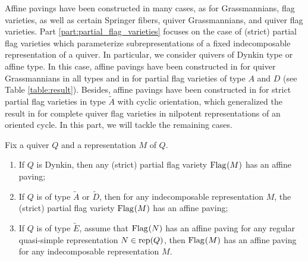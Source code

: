 Affine pavings have been constructed in many cases, as for Grassmannians, flag varieties, as well as certain Springer fibers, quiver Grassmannians, and quiver flag varieties. Part \ref{part:partial_flag_varieties} focuses on the case of (strict) partial flag varieties which parameterize subrepresentations of a fixed indecomposable representation of a quiver. In particular, we consider quivers of Dynkin type or affine type.
In this case, affine pavings have been constructed in \cite{irelli2019cell} for quiver Grassmannians in all types and in \cite{maksimau2019flag} for partial flag varieties of type $A$ and $D$ (see Table \ref{table:result}). Besides, affine pavings 
have been constructed in \cite[Theorem 6.3]{eberhardt2022motivic} for strict partial flag varieties in type $\tilde{A}$ with cyclic orientation, which generalized the result in \cite{sauter2015cell} for complete quiver flag varieties in nilpotent representations of an oriented cycle. In this part, we will tackle the remaining cases.
\begin{theoremB}\label{thm:affine_paving}
Fix a quiver $Q$ and a representation $M$ of $Q$.
\begingroup
{}
\renewcommand\labelenumi{(\theenumi)}
\upshape
\begin{enumerate}
\item If $Q$ is Dynkin, then any (strict) partial flag variety $\operatorname{Flag}_{}(M)$ has an affine paving;\label{item:B1}
\item If $Q$ is of type $\tilde{A}$ or $\tilde{D}$, then for any indecomposable representation $M$, the (strict) partial flag variety $\operatorname{Flag}_{}(M)$ has an affine paving;\label{item:B2}
\item If $Q$ is of type $\tilde{E}$, assume that $\operatorname{Flag}_{}(N)$ has an affine paving for any regular quasi-simple representation $N \in \operatorname{\operatorname{rep}}(Q)$, then $\operatorname{Flag}_{}(M)$ has an affine paving for any indecomposable representation $M$.\label{item:B3}
\end{enumerate}
\endgroup
\end{theoremB}

